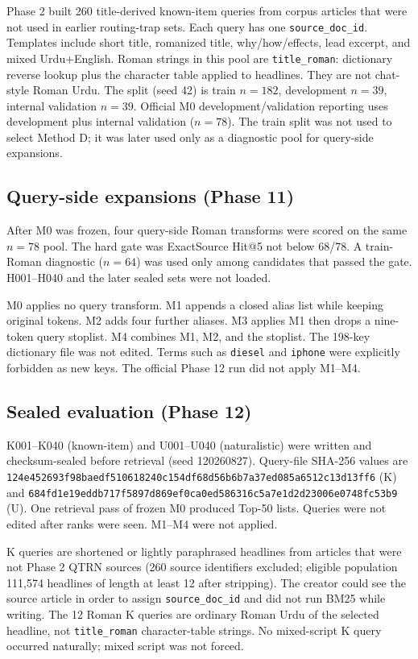 \documentclass[10pt,letterpaper]{article}
\begin{document}
Phase 2 built 260 title-derived known-item queries from corpus articles that were not used in earlier routing-trap sets. Each query has one \texttt{source\_doc\_id}. Templates include short title, romanized title, why/how/effects, lead excerpt, and mixed Urdu+English. Roman strings in this pool are \texttt{title\_roman}: dictionary reverse lookup plus the character table applied to headlines. They are not chat-style Roman Urdu. The split (seed 42) is train $n = 182$, development $n = 39$, internal validation $n = 39$. Official M0 development/validation reporting uses development plus internal validation ($n = 78$). The train split was not used to select Method D; it was later used only as a diagnostic pool for query-side expansions.

\subsection*{Query-side expansions (Phase 11)}

After M0 was frozen, four query-side Roman transforms were scored on the same $n = 78$ pool. The hard gate was ExactSource Hit@5 not below 68/78. A train-Roman diagnostic ($n = 64$) was used only among candidates that passed the gate. H001--H040 and the later sealed sets were not loaded.

M0 applies no query transform. M1 appends a closed alias list while keeping original tokens. M2 adds four further aliases. M3 applies M1 then drops a nine-token query stoplist. M4 combines M1, M2, and the stoplist. The 198-key dictionary file was not edited. Terms such as \texttt{diesel} and \texttt{iphone} were explicitly forbidden as new keys. The official Phase 12 run did not apply M1--M4.

\subsection*{Sealed evaluation (Phase 12)}

K001--K040 (known-item) and U001--U040 (naturalistic) were written and checksum-sealed before retrieval (seed 120260827). Query-file SHA-256 values are \texttt{124e452693f98baedf510618240c154df68d56b6b7a37ed085a6512c13d13ff6} (K) and \texttt{684fd1e19eddb717f5897d869ef0ca0ed586316c5a7e1d2d23006e0748fc53b9} (U). One retrieval pass of frozen M0 produced Top-50 lists. Queries were not edited after ranks were seen. M1--M4 were not applied.

K queries are shortened or lightly paraphrased headlines from articles that were not Phase 2 QTRN sources (260 source identifiers excluded; eligible population 111,574 headlines of length at least 12 after stripping). The creator could see the source article in order to assign \texttt{source\_doc\_id} and did not run BM25 while writing. The 12 Roman K queries are ordinary Roman Urdu of the selected headline, not \texttt{title\_roman} character-table strings. No mixed-script K query occurred naturally; mixed script was not forced.
\end{document}
